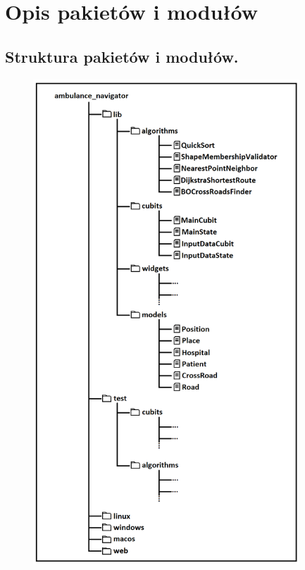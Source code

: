 \documentclass{article}
\begin{document}
\section{Opis pakietów i modułów}
\subsection{Struktura pakietów i modułów.}
\begin{figure}[H]
    \includegraphics[width=10cm]{packages.png}
    \centering
\end{figure}
\newpage
\end{document}
